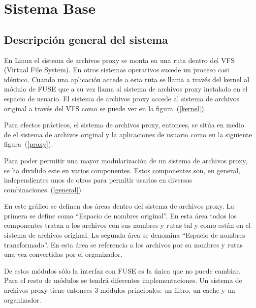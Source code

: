\chapter{Sistema Base}
\ifpdf
    \graphicspath{{Chapter2/Chapter2Figs/PNG/}{Chapter2/Chapter2Figs/PDF/}{Chapter2/Chapter2Figs/}}
\else
    \graphicspath{{Chapter2/Chapter2Figs/EPS/}{Chapter2/Chapter2Figs/}}
\fi

\section{Descripción general del sistema}

En Linux el sistema de archivos proxy se monta en una ruta dentro del VFS (Virtual File System). En otros sistemas operativos sucede un proceso casi idéntico. Cuando una aplicación accede a esta ruta se llama a través del kernel al módulo de FUSE que a su vez llama al sistema de archivos proxy instalado en el espacio de usuario. El sistema de archivos proxy accede al sistema de archivos original a través del VFS como se puede ver en la figura~(\ref{kernel}).


Para efectos prácticos, el sistema de archivos proxy, entonces, se sitúa en medio de el sistema de archivos original y la aplicaciones de usuario como en la siguiente figura~(\ref{proxy}).


Para poder permitir una mayor modularización de un sistema de archivos proxy, se ha dividido este en varios componentes. Estos componentes son, en general, independientes unos de otros para permitir usarlos en diversas combinaciones~(\ref{general}).


En este gráfico se definen dos áreas dentro del sistema de archivos proxy. La primera se define como ``Espacio de nombres original''. En esta área todos los componentes tratan a los archivos con sus nombres y rutas tal y como están en el sistema de archivos original. La segunda área se denomina ``Espacio de nombres transformado''. En esta área se referencia a los archivos por su nombres y rutas una vez convertidas por el organizador.

De estos módulos sólo la interfaz con FUSE es la única que no puede cambiar. Para el resto de módulos se tendrá diferentes implementaciones. Un sistema de archivos proxy tiene entonces 3 módulos principales: un filtro, un cache y un organizador.


